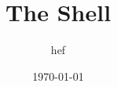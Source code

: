 \documentclass[hyperref={pdfpagelabels=false}]{beamer}
\title{The Shell}
\author{hef}
\date{\today}
\begin{document}
\frame{\titlepage}
\section[outline]{}
\frame{\tableofcontents}
\end{document}
